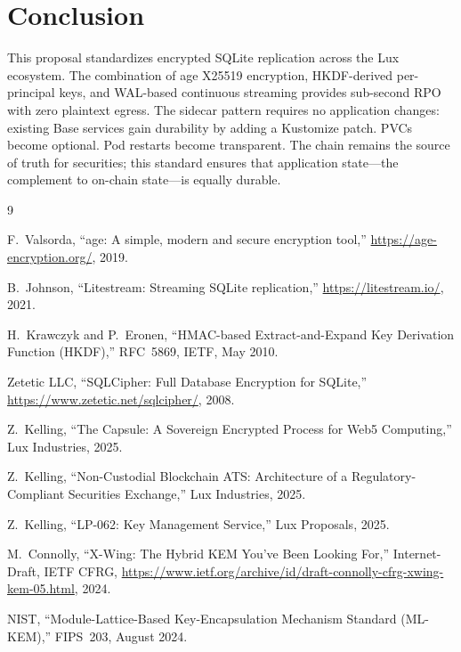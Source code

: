 \section{Conclusion}
\label{sec:conclusion}

This proposal standardizes encrypted SQLite replication across the
Lux ecosystem. The combination of age X25519 encryption,
HKDF-derived per-principal keys, and WAL-based continuous streaming
provides sub-second RPO with zero plaintext egress. The sidecar
pattern requires no application changes: existing Base services gain
durability by adding a Kustomize patch. PVCs become optional. Pod
restarts become transparent. The chain remains the source of truth
for securities; this standard ensures that application state---the
complement to on-chain state---is equally durable.

\begin{thebibliography}{9}

F.~Valsorda, ``age: A simple, modern and secure encryption tool,''
\url{https://age-encryption.org/}, 2019.

B.~Johnson, ``Litestream: Streaming SQLite replication,''
\url{https://litestream.io/}, 2021.

H.~Krawczyk and P.~Eronen, ``HMAC-based Extract-and-Expand Key
Derivation Function (HKDF),'' RFC~5869, IETF, May 2010.

Zetetic LLC, ``SQLCipher: Full Database Encryption for SQLite,''
\url{https://www.zetetic.net/sqlcipher/}, 2008.

Z.~Kelling, ``The Capsule: A Sovereign Encrypted Process for Web5
Computing,'' Lux Industries, 2025.

Z.~Kelling, ``Non-Custodial Blockchain ATS: Architecture of a
Regulatory-Compliant Securities Exchange,'' Lux Industries, 2025.

Z.~Kelling, ``LP-062: Key Management Service,'' Lux Proposals, 2025.

M.~Connolly, ``X-Wing: The Hybrid KEM You've Been Looking For,''
Internet-Draft, IETF CFRG,
\url{https://www.ietf.org/archive/id/draft-connolly-cfrg-xwing-kem-05.html},
2024.

NIST, ``Module-Lattice-Based Key-Encapsulation Mechanism Standard
(ML-KEM),'' FIPS~203, August 2024.

\end{thebibliography}

